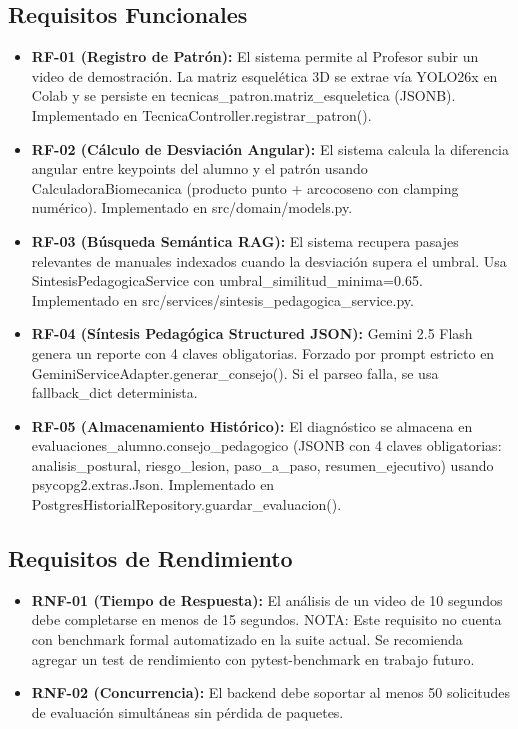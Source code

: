 \subsection{Requisitos Funcionales}
\begin{itemize}
    \item \textbf{RF-01 (Registro de Patrón):} El sistema permite al Profesor subir un video de demostración. La matriz esquelética 3D se extrae vía YOLO26x en Colab y se persiste en tecnicas\_patron.matriz\_esqueletica (JSONB). Implementado en TecnicaController.registrar\_patron().
    \item \textbf{RF-02 (Cálculo de Desviación Angular):} El sistema calcula la diferencia angular entre keypoints del alumno y el patrón usando CalculadoraBiomecanica (producto punto + arcocoseno con clamping numérico). Implementado en src/domain/models.py.
    \item \textbf{RF-03 (Búsqueda Semántica RAG):} El sistema recupera pasajes relevantes de manuales indexados cuando la desviación supera el umbral. Usa SintesisPedagogicaService con umbral\_similitud\_minima=0.65. Implementado en src/services/sintesis\_pedagogica\_service.py.
    \item \textbf{RF-04 (Síntesis Pedagógica Structured JSON):} Gemini 2.5 Flash genera un reporte con 4 claves obligatorias. Forzado por prompt estricto en GeminiServiceAdapter.generar\_consejo(). Si el parseo falla, se usa fallback\_dict determinista.
    \item \textbf{RF-05 (Almacenamiento Histórico):} El diagnóstico se almacena en evaluaciones\_alumno.consejo\_pedagogico (JSONB con 4 claves obligatorias: analisis\_postural, riesgo\_lesion, paso\_a\_paso, resumen\_ejecutivo) usando psycopg2.extras.Json. Implementado en PostgresHistorialRepository.guardar\_evaluacion().
\end{itemize}

\subsection{Requisitos de Rendimiento}
\begin{itemize}
    \item \textbf{RNF-01 (Tiempo de Respuesta):} El análisis de un video de 10 segundos debe completarse en menos de 15 segundos. NOTA: Este requisito no cuenta con benchmark formal automatizado en la suite actual. Se recomienda agregar un test de rendimiento con pytest-benchmark en trabajo futuro.
    \item \textbf{RNF-02 (Concurrencia):} El backend debe soportar al menos 50 solicitudes de evaluación simultáneas sin pérdida de paquetes.
\end{itemize}

